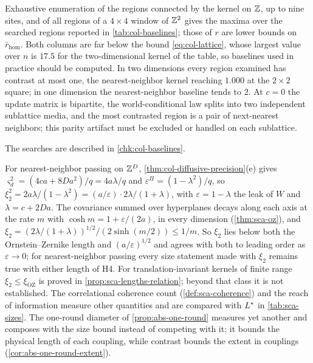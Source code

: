 \begin{observation}\label{obs:col-baselines}
Exhaustive enumeration of the regions connected by the kernel on $\mathbb{Z}$, up to nine sites, and of all regions of a $4\times4$ window of $\mathbb{Z}^2$ gives the maxima over the searched regions reported in \cref{tab:col-baselines}; those of $r$ are lower bounds on $\bar r_{\mathrm{hom}}$. Both columns are far below the bound \eqref{eq:col-lattice}, whose largest value over $n$ is $17.5$ for the two-dimensional kernel of the table, so baselines used in practice should be computed. In two dimensions every region examined has contrast at most one, the nearest-neighbor kernel reaching $1.000$ at the $2\times2$ square; in one dimension the nearest-neighbor baseline tends to $2$. At $c=0$ the update matrix is bipartite, the world-conditional law splits into two independent sublattice media, and the most contrasted region is a pair of next-nearest neighbors; this parity artifact must be excluded or handled on each sublattice.
\end{observation}
The searches are described in \cref{chk:col-baselines}.

\begin{remark}\label{rem:col-lengths}
For nearest-neighbor passing on $\mathbb{Z}^D$, \cref{thm:col-diffusive-precision}(e) gives $\varsigma_d^2=(4ca+8Da^2)/q=4a\lambda/q$ and $\varepsilon^\Pi=(1-\lambda^2)/q$, so $\xi_2^2=2a\lambda/(1-\lambda^2)=(a/\varepsilon)\cdot2\lambda/(1+\lambda)$, with $\varepsilon=1-\lambda$ the leak of $W$ and $\lambda=c+2Da$. The covariance summed over hyperplanes decays along each axis at the rate $m$ with $\cosh m=1+\varepsilon/(2a)$, in every dimension (\cref{thm:sca-oz}), and $\xi_2=(2\lambda/(1+\lambda))^{1/2}/(2\sinh(m/2))\le1/m$. So $\xi_2$ lies below both the Ornstein--Zernike length and $(a/\varepsilon)^{1/2}$ and agrees with both to leading order as $\varepsilon\to0$; for nearest-neighbor passing every size statement made with $\xi_2$ remains true with either length of H4. For translation-invariant kernels of finite range $\xi_2\le\xi_{\mathrm{OZ}}$ is proved in \cref{prop:sca-lengths-relation}; beyond that class it is not established. The correlational coherence count (\cref{def:sca-coherence}) and the reach of information measure other quantities and are compared with $L^{\ast}$ in \cref{tab:sca-sizes}. The one-round diameter of \cref{prop:abs-one-round} measures yet another and composes with the size bound instead of competing with it: it bounds the physical length of each coupling, while contrast bounds the extent in couplings (\cref{cor:abs-one-round-extent}).
\end{remark}

